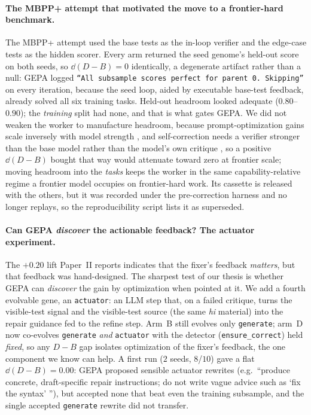 \documentclass[11pt]{article}
\begin{document}
\paragraph{The MBPP+ attempt that motivated the move to a frontier-hard benchmark.}
The MBPP+ attempt used the base tests as
the in-loop verifier and the edge-case tests as the hidden scorer. Every arm returned the
seed genome's held-out score on both seeds, so $\dd(D{-}B)=0$ identically, a degenerate
artifact rather than a null: GEPA logged \texttt{``All subsample scores perfect for parent
0. Skipping''} on every iteration, because the seed loop, aided by executable base-test
feedback, already solved all six training tasks. Held-out headroom looked adequate
($0.80$--$0.90$); the \emph{training} split had none, and that is what gates GEPA. We did
not weaken the worker to manufacture headroom, because prompt-optimization gains scale
inversely with model strength \citep{zhou2025bbopromptscale}, and self-correction needs a
verifier stronger than the base model rather than the model's own critique
\citep{zhang2024smallverifiers}, so a positive
$\dd(D{-}B)$ bought
that way would attenuate toward zero at frontier scale; moving headroom into the
\emph{tasks} keeps the worker in the same capability-relative regime a frontier model
occupies on frontier-hard work. Its cassette is released with the others, but it was recorded
under the pre-correction harness and no longer replays, so the reproducibility script lists it
as superseded.

\paragraph{Can GEPA \emph{discover} the actionable feedback? The actuator experiment.}
The $+0.20$ lift Paper~II reports indicates that the fixer's feedback \emph{matters}, but that
feedback was hand-designed. The sharpest test of our thesis is whether GEPA can \emph{discover} the
gain by optimization when pointed at it. We add a fourth evolvable gene, an
\texttt{actuator}: an LLM step that, on a failed critique, turns the visible-test signal and
the visible-test source (the same \emph{hi} material) into the repair guidance fed to the
refine step. Arm~B still evolves only \texttt{generate}; arm~D now co-evolves \texttt{generate}
\emph{and} \texttt{actuator} with the detector (\texttt{ensure\_correct}) held \emph{fixed}, so
any $D-B$ gap isolates optimization of the fixer's feedback, the one component we know can
help. A first run ($2$ seeds, $8$/$10$) gave a flat $\dd(D-B)=0.00$: GEPA proposed sensible
actuator rewrites (e.g.\ ``produce concrete, draft-specific repair instructions; do not write
vague advice such as `fix the syntax' ''), but accepted none that beat even the training
subsample, and the single accepted \texttt{generate} rewrite did not transfer.
\end{document}
